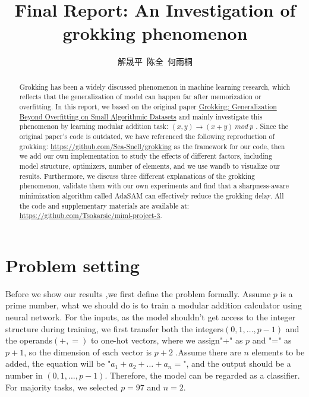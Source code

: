 \documentclass{article}
\title{Final Report: An Investigation of grokking phenomenon}
\author{解晟平\  陈全\  何雨桐}
\begin{document}
\maketitle
\vspace{-1.5em}
\begin{abstract}
 Grokking has been a widely discussed phenomenon in machine learning research, which reflects that the generalization of model can happen far after memorization or overfitting. In this report, we based on the original paper \href{https://arxiv.org/pdf/2201.02177}{Grokking: Generalization Beyond Overfitting on Small Algorithmic Datasets}  and mainly investigate this phenomenon by learning modular addition task: $(x, y) \rightarrow (x + y)\ mod\ p$ . Since the original paper's code is outdated, we have referenced the following reproduction of grokking: \href{https://github.com/Sea-Snell/grokking}{https://github.com/Sea-Snell/grokking}  as the framework for our code, then we add our own implementation to study the effects of different factors, including model structure, optimizers, number of  elements, and we use wandb to visualize our results. Furthermore, we discuss three different explanations of the grokking phenomenon, validate them with our own experiments and find that a sharpness-aware minimization algorithm called AdaSAM can effectively reduce the grokking delay. All the code and supplementary materials are available at: \href{https://github.com/Tsokarsic/miml-project-3}{https://github.com/Tsokarsic/miml-project-3}.
\end{abstract}

\vspace{-1em}
\section{Problem setting}
\vspace{-1em}

Before we show our results ,we first define the problem formally. Assume $p$ is a prime number, what we should do is to train a modular addition calculator using neural network. For the inputs, as the model shouldn't get access to the integer structure during training, we first transfer both the integers$(0, 1, \ldots, p-1) 
$ and the operands$(+,=)$ to one-hot vectors, where we assign"+" as $p$ and "=" as $p+1$, so the dimension of each vector is $p+2$ .Assume there are $n$ elements to be added, the equation will be "${a_1+a_2+\ldots+a_n=} $", and the output should be a number in $(0, 1, \ldots, p-1) $. Therefore, the model can be regarded as a classifier.  For majority tasks, we selected $p=97$ and $n=2$.
\end{document}
